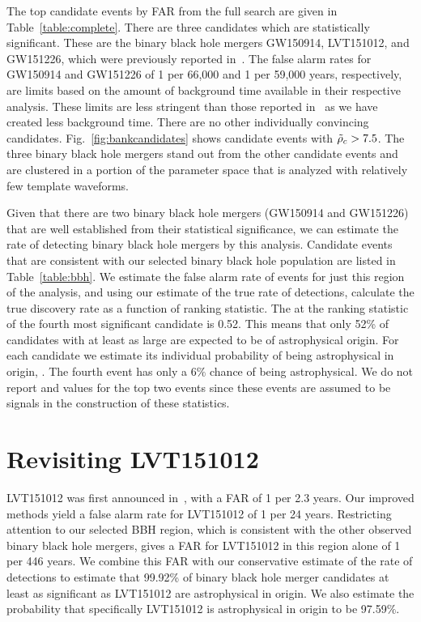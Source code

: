 The top candidate events by FAR from the full search are given in Table~\ref{table:complete}. There are three candidates which are statistically significant. These are the binary black hole mergers GW150914, LVT151012, and GW151226, which were previously reported in~\cite{TheLIGOScientific:2016pea,Abbott:2016blz,Abbott:2016nmj}. The false alarm rates for GW150914 and GW151226 of 1 per 66,000 and 1 per 59,000 years, respectively, are limits based on the amount of background time available in their respective analysis. These limits are less stringent than those reported in~\cite{TheLIGOScientific:2016pea} as we have created less background time. There are no other individually convincing candidates. Fig.~\ref{fig:bankcandidates} shows candidate events with $\tilde{\rho}_c > 7.5$. The three binary black hole mergers stand out from the other candidate events and are clustered in a portion of the parameter space that is analyzed with relatively few template waveforms.

Given that there are two binary black hole mergers (GW150914 and GW151226) that are well established from their
statistical significance, we can estimate the rate of detecting binary black hole mergers by this analysis. Candidate
events that are consistent with our selected binary black hole population are listed in
Table~\ref{table:bbh}. We estimate the false alarm rate of events for just this region of the analysis, and using our
estimate of the true rate of detections, calculate the true discovery rate as a function of ranking statistic. The
\tdr{} at the ranking statistic of the fourth most significant candidate is 0.52. This means that only 52\% of
candidates with \rankingstat{} at least as large are expected to be of astrophysical origin. For each candidate we estimate its
individual probability of being astrophysical in origin, \pastro{}. The fourth event has only a 6$\%$ chance of being
astrophysical. We do not report \pastro{} and \tdr{} values for the top two events since these events
are assumed to be signals in the construction of these statistics.


\section{Revisiting LVT151012}

LVT151012 was first announced in~\cite{TheLIGOScientific:2016qqj}, with a FAR
of 1 per 2.3 years. Our improved methods yield a false alarm rate for LVT151012
of 1 per 24 years. Restricting attention to our selected BBH region, which is
consistent with the other observed binary black hole mergers, gives a FAR for
LVT151012 in this region alone of 1 per 446 years. We combine this FAR  with
our conservative estimate of the rate of detections to estimate that 99.92\% of
binary black hole merger candidates at least as significant as LVT151012 are
astrophysical in origin. We also estimate the probability that specifically
LVT151012 is astrophysical in origin to be 97.59$\%$.


